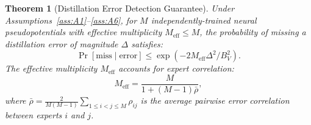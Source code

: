 \documentclass[11pt,a4paper]{article}
\newtheorem{theorem}{Theorem}[section]
\theoremstyle{definition}
\begin{document}
\begin{theorem}[Distillation Error Detection Guarantee]\label{thm:detection}
Under Assumptions~\ref{ass:A1}--\ref{ass:A6}, for $M$ independently-trained neural pseudopotentials with effective multiplicity $M_{\mathrm{eff}} \leq M$, the probability of missing a distillation error of magnitude $\Delta$ satisfies:
\begin{equation}\label{eq:main_bound}
\Pr[\text{miss} \mid \text{error}] \leq \exp\left(-2 M_{\mathrm{eff}} \Delta^2 / B_V^2\right).
\end{equation}
The effective multiplicity $M_{\mathrm{eff}}$ accounts for expert correlation:
\begin{equation}\label{eq:meff}
M_{\mathrm{eff}} = \frac{M}{1 + (M-1)\bar{\rho}},
\end{equation}
where $\bar{\rho} = \frac{2}{M(M-1)}\sum_{1 \leq i < j \leq M} \rho_{ij}$ is the average pairwise error correlation between experts $i$ and $j$.
\end{theorem}
\end{document}
